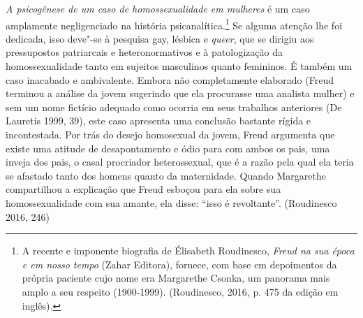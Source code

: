 \emph{A psicogênese de um caso de homossexualidade em mulheres} é um
caso amplamente negligenciado na história psicanalítica.\footnote{A
  recente e imponente biografia de Élisabeth Roudinesco, \emph{Freud na
  sua época e em nosso tempo} (Zahar Editora), fornece, com base em
  depoimentos da própria paciente cujo nome era Margarethe Csonka, um
  panorama mais amplo a seu respeito (1900-1999). (Roudinesco, 2016, p.
  475 da edição em inglês).} Se alguma atenção lhe foi dedicada, isso
deve"-se à pesquisa gay, lésbica e \emph{queer}, que se dirigiu aos
pressupostos patriarcais e heteronormativos e à patologização da
homossexualidade tanto em sujeitos masculinos quanto femininos. É também
um caso inacabado e ambivalente. Embora não completamente elaborado
(Freud terminou a análise da jovem sugerindo que ela procurasse uma
analista mulher) e sem um nome fictício adequado como ocorria em seus
trabalhos anteriores (De Lauretis 1999, 39), este caso apresenta uma
conclusão bastante rígida e incontestada. Por trás do desejo homosexual
da jovem, Freud argumenta que existe uma atitude de desapontamento e
ódio para com ambos os pais, uma inveja dos pais, o casal procriador
heterossexual, que é a razão pela qual ela teria se afastado tanto dos
homens quanto da maternidade. Quando Margarethe compartilhou a
explicação que Freud esboçou para ela sobre sua homossexualidade com sua
amante, ela disse: ``isso é revoltante''. (Roudinesco 2016, 246)

